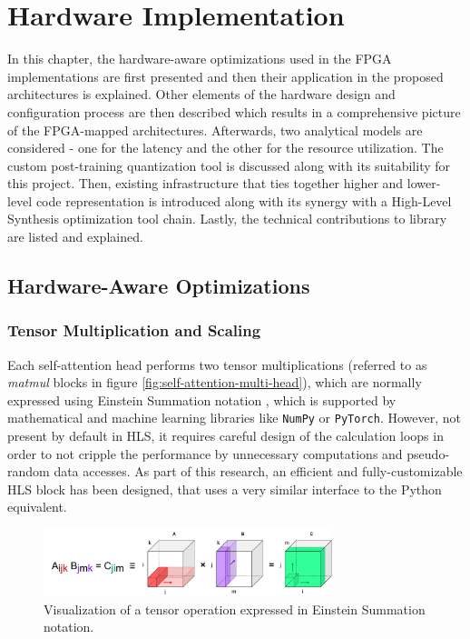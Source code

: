 \chapter{Hardware Implementation}\label{quantization}
In this chapter, the hardware-aware optimizations used in the FPGA implementations are first presented and then their application in the proposed architectures is explained. Other elements of the hardware design and configuration process are then described which results in a comprehensive picture of the FPGA-mapped architectures. Afterwards, two analytical models are considered - one for the latency and the other for the resource utilization. The custom post-training quantization tool is discussed along with its suitability for this project. Then, existing infrastructure that ties together higher and lower-level code representation is introduced along with its synergy with a High-Level Synthesis optimization tool chain. Lastly, the technical contributions to \hlsml library are listed and explained.

\section{Hardware-Aware Optimizations}

\subsection{Tensor Multiplication and Scaling}
Each self-attention head performs two tensor multiplications (referred to as \textit{matmul} blocks in figure \ref{fig:self-attention-multi-head}), which are normally expressed using Einstein Summation notation \cite{59-barr1991einstein}, which is supported by mathematical and machine learning libraries like \texttt{NumPy} or \texttt{PyTorch}. However, not present by default in HLS, it requires careful design of the calculation loops in order to not cripple the performance by unnecessary computations and pseudo-random data accesses. As part of this research, an efficient and fully-customizable HLS block has been designed, that uses a very similar interface to the Python equivalent.

\begin{figure}[hpt!]
  \centering
  \includegraphics[trim={0cm 0cm 0cm 0cm}, width=0.75\textwidth, center]{models/einsum.pdf}
  \caption{Visualization of a tensor operation expressed in Einstein Summation notation.}
  \label{fig:einsum}
\end{figure}

